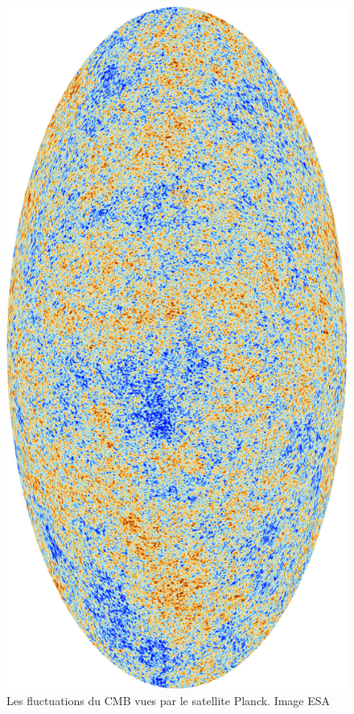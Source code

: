 \begin{figure}[htbp]
        \includegraphics[height=.95\textheight]{img/01/CMB.jpeg} 
        \caption{Les fluctuations du \ac{CMB} vues par le satellite Planck. 
        Image ESA}
 		\label{fig:cmb}
\end{figure}

